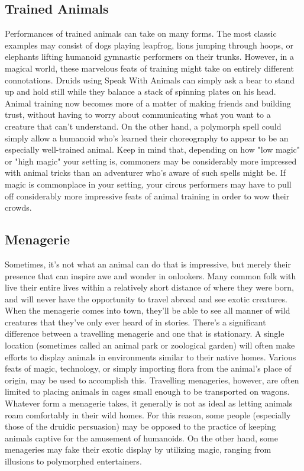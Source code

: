 \documentclass[10pt,a4paper,twoside,twocolumn,openany,bg=print,nodeprecatedcode]{dndbook}
\begin{document}
\subsection{Trained Animals}
Performances of trained animals can take on many forms. The most classic examples may consist of dogs playing leapfrog, lions jumping through hoops, or elephants lifting humanoid gymnastic performers on their trunks. However, in a magical world, these marvelous feats of training might take on entirely different connotations. Druids using Speak With Animals can simply ask a bear to stand up and hold still while they balance a stack of spinning plates on his head. Animal training now becomes more of a matter of making friends and building trust, without having to worry about communicating what you want to a creature that can't understand.
On the other hand, a polymorph spell could simply allow a humanoid who's learned their choreography to appear to be an especially well-trained animal. Keep in mind that, depending on how "low magic" or "high magic" your setting is, commoners may be considerably more impressed with animal tricks than an adventurer who's aware of such spells might be. If magic is commonplace in your setting, your circus performers may have to pull off considerably more impressive feats of animal training in order to wow their crowds.
\subsection{Menagerie}
Sometimes, it's not what an animal can do that is impressive, but merely their presence that can inspire awe and wonder in onlookers. Many common folk with live their entire lives within a relatively short distance of where they were born, and will never have the opportunity to travel abroad and see exotic creatures. When the menagerie comes into town, they'll be able to see all manner of wild creatures that they've only ever heard of in stories.
There's a significant difference between a travelling menagerie and one that is stationary. A single location (sometimes called an animal park or zoological garden) will often make efforts to display animals in environments similar to their native homes. Various feats of magic, technology, or simply importing flora from the animal's place of origin, may be used to accomplish this. Travelling menageries, however, are often limited to placing animals in cages small enough to be transported on wagons.
Whatever form a menagerie takes, it generally is not as ideal as letting animals roam comfortably in their wild homes. For this reason, some people (especially those of the druidic persuasion) may be opposed to the practice of keeping animals captive for the amusement of humanoids. On the other hand, some menageries may fake their exotic display by utilizing magic, ranging from illusions to polymorphed entertainers.
\end{document}
